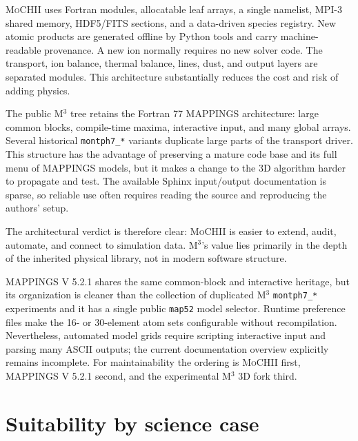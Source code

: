 \documentclass[english,a4paper]{my_memo}
\newcommand{\code}[1]{\texttt{#1}}
\newcommand{\MoCHII}{\textsc{MoCHII}}
\newcommand{\Mthree}{M$^3$}
\newcommand{\Mappings}{MAPPINGS V 5.2.1}
\begin{document}
\MoCHII{} uses Fortran modules, allocatable leaf arrays, a single namelist,
MPI-3 shared memory, HDF5/FITS sections, and a data-driven species
registry.  New atomic products are generated offline by Python tools and
carry machine-readable provenance.  A new ion normally requires no new
solver code.  The transport, ion balance, thermal balance, lines, dust,
and output layers are separated modules.  This architecture substantially
reduces the cost and risk of adding physics.

The public \Mthree{} tree retains the Fortran 77 MAPPINGS architecture:
large common blocks, compile-time maxima, interactive input, and many
global arrays.  Several historical \code{montph7\_*} variants duplicate
large parts of the transport driver.  This structure has the advantage of
preserving a mature code base and its full menu of MAPPINGS models, but it
makes a change to the 3D algorithm harder to propagate and test.  The
available Sphinx input/output documentation is sparse, so reliable use
often requires reading the source and reproducing the authors' setup.

The architectural verdict is therefore clear: \MoCHII{} is easier to
extend, audit, automate, and connect to simulation data.  \Mthree{}'s
value lies primarily in the depth of the inherited physical library, not
in modern software structure.

\Mappings{} shares the same common-block and interactive heritage, but its
organization is cleaner than the collection of duplicated \Mthree{}
\code{montph7\_*} experiments and it has a single public \code{map52}
model selector.  Runtime preference files make the 16- or 30-element atom
sets configurable without recompilation.  Nevertheless, automated model
grids require scripting interactive input and parsing many ASCII outputs;
the current documentation overview explicitly remains incomplete.  For
maintainability the ordering is \MoCHII{} first, \Mappings{} second, and
the experimental \Mthree{} 3D fork third.

\section{Suitability by science case}
\end{document}
